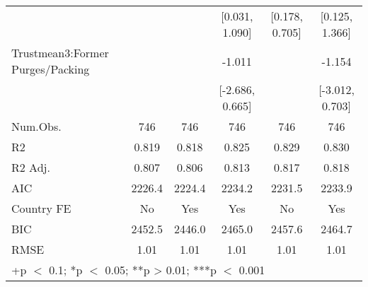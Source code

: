\begin{table}
\begin{tabular}[t]{lccccc}
 &  &  & {}[0.031, 1.090] & {}[0.178, 0.705] & {}[0.125, 1.366]\\
Trustmean3:Former Purges/Packing &  &  & -1.011 &  & -1.154\\
 &  &  & {}[-2.686, 0.665] &  & {}[-3.012, 0.703]\\
\midrule
Num.Obs. & 746 & 746 & 746 & 746 & 746\\
R2 & 0.819 & 0.818 & 0.825 & 0.829 & 0.830\\
R2 Adj. & 0.807 & 0.806 & 0.813 & 0.817 & 0.818\\
AIC & 2226.4 & 2224.4 & 2234.2 & 2231.5 & 2233.9\\
Country FE & No & Yes & Yes & No & Yes\\
BIC & 2452.5 & 2446.0 & 2465.0 & 2457.6 & 2464.7\\
RMSE & 1.01 & 1.01 & 1.01 & 1.01 & 1.01\\
\bottomrule
\multicolumn{6}{l}{\rule{0pt}{1em}+p $<$ 0.1; *p $<$ 0.05; **p > 0.01; ***p $<$ 0.001}\\
\end{tabular}
\end{table}
